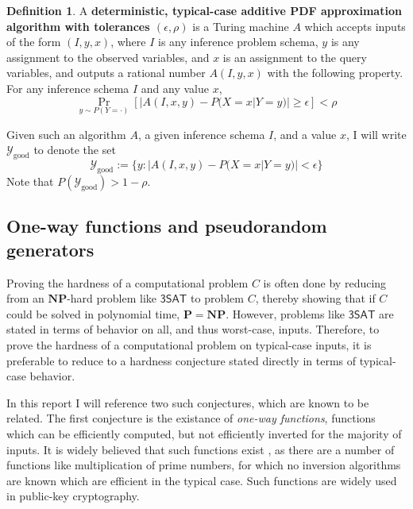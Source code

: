 \documentclass{article}
\renewcommand{\P}{\mathbf{P}}
\newcommand{\NP}{\mathbf{NP}}
\def \Ygood{\mathcal{Y}_\text{good}}
\theoremstyle{definition}
\newtheorem{defn}{Definition}
\theoremstyle{remark}
\begin{document}
\begin{defn} \label{def:typical_case_add_alg}
A \textbf{deterministic, typical-case additive PDF approximation algorithm with tolerances $(\epsilon, \rho)$} is a Turing machine $A$ which accepts inputs of the form
$(I, y, x)$, where $I$ is any inference problem schema, $y$ is any assignment to the observed variables, and $x$ is an assignment to the query variables, and outputs a rational number $A(I, y, x)$ with the following property.
For any inference schema $I$ and any value $x$,
$$
\Pr_{y \sim P(Y = \cdot)}[|A(I, x, y) - P(X = x | Y = y)| \geq \epsilon] < \rho
$$

Given such an algorithm $A$, a given inference schema $I$, and a value $x$, I will write $\Ygood$ to denote the set
$$
\Ygood := \{y : |A(I, x, y) - P(X = x | Y = y)| < \epsilon\}
$$
Note that $P(\Ygood) > 1 - \rho$.
\end{defn}

\subsection{One-way functions and pseudorandom generators}
Proving the hardness of a computational problem $C$ is often done by reducing from an $\NP$-hard problem like $\mathsf{3SAT}$ to problem $C$, thereby showing that if $C$ could be solved in polynomial time, $\P = \NP$.
However, problems like $\mathsf{3SAT}$ are stated in terms of behavior on all, and thus worst-case, inputs.
Therefore, to prove the hardness of a computational problem on typical-case inputs, it is preferable to reduce to a hardness conjecture stated directly in terms of typical-case behavior.

In this report I will reference two such conjectures, which are known to be related.
The first conjecture is the existance of \textit{one-way functions}, functions which can be efficiently computed, but not efficiently inverted for the majority of inputs.
It is widely believed that such functions exist \cite{}, as there are a number of functions like multiplication of prime numbers, for which no inversion algorithms are known which are efficient in the typical case.
Such functions are widely used in public-key cryptography.
\end{document}
